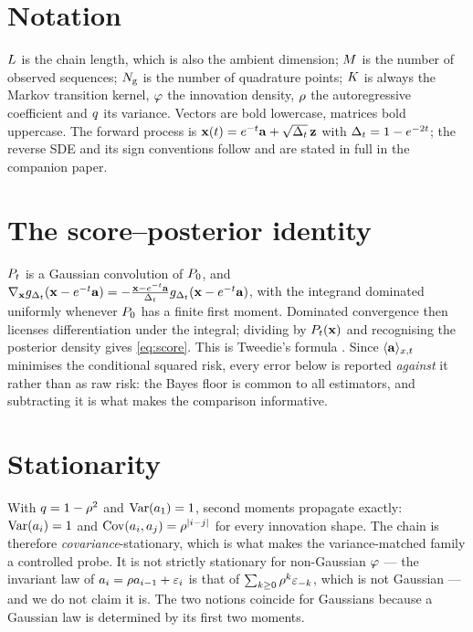 
\section{Notation}
\label{app:notation}

$L$ is the chain length, which is also the ambient dimension; $M$ is the number of
observed sequences; $N_{\mathrm{g}}$ is the number of quadrature points; $K$ is always the Markov
transition kernel, $\varphi$ the innovation density, $\rho$ the autoregressive coefficient and
$q$ its variance. Vectors are bold lowercase, matrices bold uppercase. The forward process is
$\mathbf{x}(t)=e^{-t}\mathbf{a}+\sqrt{\Delta_t}\,\mathbf{z}$ with $\Delta_t=1-e^{-2t}$; the reverse SDE and its sign conventions
follow \citet{anderson1982reverse,haussmann1986} and are stated in full in the companion paper.

\section{The score--posterior identity}
\label{app:identity}

$P_t$ is a Gaussian convolution of $P_0$, and
$\nabla_{\mathbf{x}} g_{\Delta_t}(\mathbf{x}-e^{-t}\mathbf{a})=-\tfrac{\mathbf{x}-e^{-t}\mathbf{a}}{\Delta_t}g_{\Delta_t}(\mathbf{x}-e^{-t}\mathbf{a})$, with the
integrand dominated uniformly whenever $P_0$ has a finite first moment. Dominated convergence then
licenses differentiation under the integral; dividing by $P_t(\mathbf{x})$ and recognising the posterior
density gives \eqref{eq:score}. This is Tweedie's formula
\citep{robbins1956empirical,miyasawa1961empirical,efron2011tweedie}. Since $\langle \mathbf{a} \rangle_{x,t}$ minimises the conditional squared
risk, every error below is reported \emph{against} it rather than as raw risk: the Bayes floor is
common to all estimators, and subtracting it is what makes the comparison informative.

\section{Stationarity}
\label{app:stationary}

With $q=1-\rho^2$ and $\operatorname{Var}(a_1)=1$, second moments propagate exactly: $\operatorname{Var}(a_i)=1$ and
$\operatorname{Cov}(a_i,a_j)=\rho^{|i-j|}$ for every innovation shape. The chain is therefore
\emph{covariance}-stationary, which is what makes the variance-matched family a controlled probe.
It is not strictly stationary for non-Gaussian $\varphi$ --- the invariant law of
$a_i=\rho a_{i-1}+\varepsilon_i$ is that of $\sum_{k\ge0}\rho^k\varepsilon_{-k}$, which is not
Gaussian --- and we do not claim it is. The two notions coincide for Gaussians because a Gaussian
law is determined by its first two moments.

